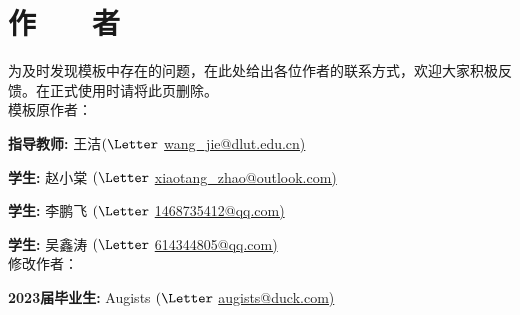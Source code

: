 
\chapter*{\hfill 作　　者 \hfill}
\linespread{1.25}
\sloppy{}

为及时发现模板中存在的问题，在此处给出各位作者的联系方式，欢迎大家积极反馈。在正式使用时请将此页删除。\\

模板原作者：

\vspace{17.06pt}
\textbf{指导教师:} 王洁${(\textrm{\Letter}}$ \href{mailto:wang_jie@dlut.edu.cn}{wang\_jie@dlut.edu.cn)}

\vspace{17.06pt}
\textbf{学生:} 赵小棠 ${(\textrm{\Letter}}$ \href{mailto:xiaotang_zhao@outlook.com}{xiaotang\_zhao@outlook.com)}

\vspace{17.06pt}
\textbf{学生:} 李鹏飞 ${(\textrm{\Letter}}$ \href{mailto:1468735412@qq.com}{1468735412@qq.com)}

\vspace{17.06pt}
\textbf{学生:} 吴鑫涛 ${(\textrm{\Letter}}$ \href{mailto:614344805@qq.com}{614344805@qq.com)}\\

修改作者：

\vspace{17.06pt}
\textbf{2023届毕业生:} Augists ${(\textrm{\Letter}}$ \href{mailto:augists@duck.com}{augists@duck.com)}